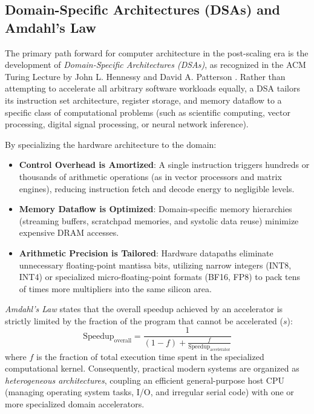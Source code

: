 \subsection{Domain-Specific Architectures (DSAs) and Amdahl's Law}
The primary path forward for computer architecture in the post-scaling era is the development of \textit{Domain-Specific Architectures (DSAs)}, as recognized in the ACM Turing Lecture by John L. Hennessy and David A. Patterson \cite{hennessy2019new}. Rather than attempting to accelerate all arbitrary software workloads equally, a DSA tailors its instruction set architecture, register storage, and memory dataflow to a specific class of computational problems (such as scientific computing, vector processing, digital signal processing, or neural network inference).

By specializing the hardware architecture to the domain:
\begin{itemize}
    \item \textbf{Control Overhead is Amortized}: A single instruction triggers hundreds or thousands of arithmetic operations (as in vector processors and matrix engines), reducing instruction fetch and decode energy to negligible levels.
    \item \textbf{Memory Dataflow is Optimized}: Domain-specific memory hierarchies (streaming buffers, scratchpad memories, and systolic data reuse) minimize expensive DRAM accesses.
    \item \textbf{Arithmetic Precision is Tailored}: Hardware datapaths eliminate unnecessary floating-point mantissa bits, utilizing narrow integers (INT8, INT4) or specialized micro-floating-point formats (BF16, FP8) to pack tens of times more multipliers into the same silicon area.
\end{itemize}

\textit{Amdahl's Law} states that the overall speedup achieved by an accelerator is strictly limited by the fraction of the program that cannot be accelerated ($s$):
\begin{equation}
\text{Speedup}_{\text{overall}} = \frac{1}{(1 - f) + \frac{f}{\text{Speedup}_{\text{accelerator}}}}
\end{equation}
where $f$ is the fraction of total execution time spent in the specialized computational kernel. Consequently, practical modern systems are organized as \textit{heterogeneous architectures}, coupling an efficient general-purpose host CPU (managing operating system tasks, I/O, and irregular serial code) with one or more specialized domain accelerators.

